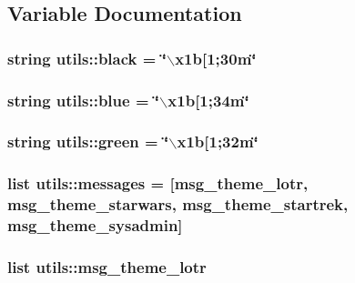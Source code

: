 \subsection{\-Variable \-Documentation}
\hypertarget{namespaceutils_abc82b697db81e567498bcbe13f0e779c}{
\subsubsection[{black}]{\setlength{\rightskip}{0pt plus 5cm}string {\bf utils\-::black} = \char`\"{}$\backslash$x1b\mbox{[}1;30m\char`\"{}}}\label{namespaceutils_abc82b697db81e567498bcbe13f0e779c}
\hypertarget{namespaceutils_a1a020aeffa1a4432a8a019ab23e6bf2e}{
\subsubsection[{blue}]{\setlength{\rightskip}{0pt plus 5cm}string {\bf utils\-::blue} = \char`\"{}$\backslash$x1b\mbox{[}1;34m\char`\"{}}}\label{namespaceutils_a1a020aeffa1a4432a8a019ab23e6bf2e}
\hypertarget{namespaceutils_aa285405dc43840d42dfc4f47a09bed6a}{
\subsubsection[{green}]{\setlength{\rightskip}{0pt plus 5cm}string {\bf utils\-::green} = \char`\"{}$\backslash$x1b\mbox{[}1;32m\char`\"{}}}\label{namespaceutils_aa285405dc43840d42dfc4f47a09bed6a}
\hypertarget{namespaceutils_ac2d8fb5f5c3b7e5519dc8d06afb69703}{
\subsubsection[{messages}]{\setlength{\rightskip}{0pt plus 5cm}list {\bf utils\-::messages} = \mbox{[}{\bf msg\-\_\-theme\-\_\-lotr}, {\bf msg\-\_\-theme\-\_\-starwars}, {\bf msg\-\_\-theme\-\_\-startrek}, {\bf msg\-\_\-theme\-\_\-sysadmin}\mbox{]}}}\label{namespaceutils_ac2d8fb5f5c3b7e5519dc8d06afb69703}
\hypertarget{namespaceutils_a5d8a2a3ac46fbc8e7280b92c7e958fb1}{
\subsubsection[{msg\-\_\-theme\-\_\-lotr}]{\setlength{\rightskip}{0pt plus 5cm}list {\bf utils\-::msg\-\_\-theme\-\_\-lotr}}}\label{namespaceutils_a5d8a2a3ac46fbc8e7280b92c7e958fb1}
